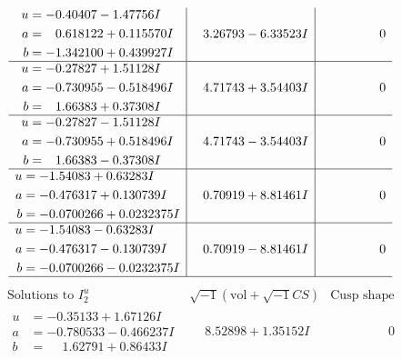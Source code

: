 \documentclass[1p]{elsarticle_modified}
\theoremstyle{definition}
\newcommand{\I}{\sqrt{-1}}
\begin{document}
$$\begin{array}{c|c|c}
\begin{aligned}
u &= -0.40407 - 1.47756 I \\
a &= \phantom{-}0.618122 + 0.115570 I \\
b &= -1.342100 + 0.439927 I\end{aligned}
 & \phantom{-}3.26793 - 6.33523 I & \phantom{-0.000000 } 0 \\ \hline\begin{aligned}
u &= -0.27827 + 1.51128 I \\
a &= -0.730955 - 0.518496 I \\
b &= \phantom{-}1.66383 + 0.37308 I\end{aligned}
 & \phantom{-}4.71743 + 3.54403 I & \phantom{-0.000000 } 0 \\ \hline\begin{aligned}
u &= -0.27827 - 1.51128 I \\
a &= -0.730955 + 0.518496 I \\
b &= \phantom{-}1.66383 - 0.37308 I\end{aligned}
 & \phantom{-}4.71743 - 3.54403 I & \phantom{-0.000000 } 0 \\ \hline\begin{aligned}
u &= -1.54083 + 0.63283 I \\
a &= -0.476317 + 0.130739 I \\
b &= -0.0700266 + 0.0232375 I\end{aligned}
 & \phantom{-}0.70919 + 8.81461 I & \phantom{-0.000000 } 0 \\ \hline\begin{aligned}
u &= -1.54083 - 0.63283 I \\
a &= -0.476317 - 0.130739 I \\
b &= -0.0700266 - 0.0232375 I\end{aligned}
 & \phantom{-}0.70919 - 8.81461 I & \phantom{-0.000000 } 0\\
 \hline 
 \end{array}$$\newpage$$\begin{array}{c|c|c}  
\text{Solutions to }I^u_{2}& \I (\text{vol} + \sqrt{-1}CS) & \text{Cusp shape}\\
 \hline 
\begin{aligned}
u &= -0.35133 + 1.67126 I \\
a &= -0.780533 - 0.466237 I \\
b &= \phantom{-}1.62791 + 0.86433 I\end{aligned}
 & \phantom{-}8.52898 + 1.35152 I & \phantom{-0.000000 } 0 \\ \hline\begin{aligned}

\end{aligned}
\end{array}$$
\end{document}
